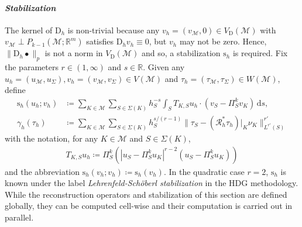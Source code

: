 \documentclass[a4paper]{amsart}
\numberwithin{equation}{section}
\newcommand{\R}{\mathbb{R}}
\renewcommand{\d}[1]{\,\mathrm{d}#1}
\renewcommand{\div}{\mathrm{div}}
\newcommand{\I}{\mathrm{I}}
\newcommand{\Mcal}{\mathcal{M}}
\newcommand{\RT}{\mathrm{RT}}
\newcommand{\pw}{\mathrm{pw}}
\newcommand{\D}{\mathrm{D}}
\newcommand{\s}{\mathrm{s}}
\newcommand{\M}{\mathbb{M}}
\theoremstyle{remark}
\newtheorem{remark}[theorem]{Remark}
\begin{document}

\paragraph{\emph{Stabilization}}
The kernel of $\D_h$ is non-trivial because any $v_h = (v_\Mcal,0) \in V_\mathrm{D}(\Mcal)$ with $v_\Mcal \perp P_{k-1}(\Mcal;\R^m)$ satisfies $\D_h v_h \equiv 0$, but $v_h$ may not be zero. Hence, $\|\D_h \bullet\|_p$ is not a norm in $V_\mathrm{D}(\Mcal)$ and so, a stabilization $\s_h$ is required.
Fix the parameters $r \in (1,\infty)$ and $s \in \mathbb{R}$.
Given any $u_h = (u_\Mcal,u_\Sigma), v_h = (v_\Mcal,v_\Sigma) \in V(\Mcal)$ and $\tau_h = (\tau_\Mcal,\tau_\Sigma) \in W(\Mcal)$, define
\begin{align}
	\s_h(u_h;v_h) &\coloneqq \sum_{K \in \Mcal} \sum_{S \in \Sigma(K)} h_S^{-s} \int_S T_{K,S} u_h \cdot (v_S - \Pi_S^k v_K) \d{s},
	\label{def:stabilization-primal}\\
	\gamma_h(\tau_h) &\coloneqq \sum_{K \in \Mcal} \sum_{S \in \Sigma(K)} h_S^{s/(r-1)} \|\tau_S - (\mathcal{R}_h^* \tau_h)|_K \nu_K\|_{L^{r'}(S)}^{r'}
	\label{def:stabilization-dual}
\end{align}
with the notation, for any $K \in \Mcal$ and $S \in \Sigma(K)$,
\begin{align}\label{def:trace-operator}
	T_{K,S} u_h \coloneqq \Pi_S^k (|u_S - \Pi_S^k u_K|^{r-2} (u_S - \Pi_S^k u_K))
\end{align}
and the abbreviation $\s_h(v_h;v_h) \coloneqq \s_h(v_h)$.
In the quadratic case $r = 2$, $\s_h$ is known under the label \emph{Lehrenfeld-Sch\"oberl stabilization} in the HDG methodology.
While the reconstruction operators and stabilization of this section are defined globally, they can be computed cell-wise and their computation is carried out in parallel.
\end{document}

